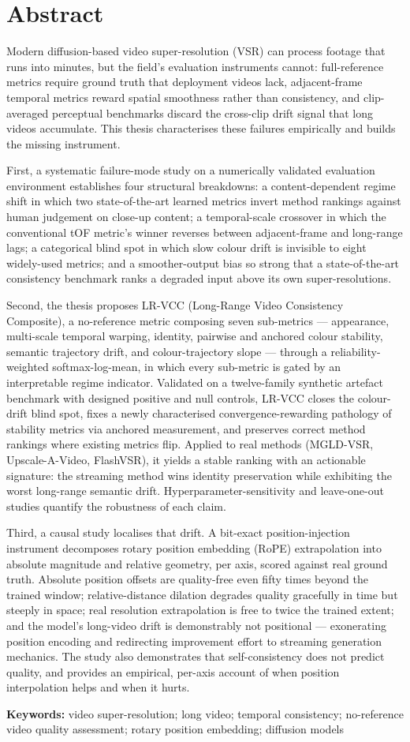 \chapter*{Abstract}
\thispagestyle{previous}

Modern diffusion-based video super-resolution (VSR) can process footage that
runs into minutes, but the field's evaluation instruments cannot: full-reference
metrics require ground truth that deployment videos lack, adjacent-frame
temporal metrics reward spatial smoothness rather than consistency, and
clip-averaged perceptual benchmarks discard the cross-clip drift signal that
long videos accumulate. This thesis characterises these failures empirically and
builds the missing instrument.

First, a systematic failure-mode study on a numerically validated evaluation
environment establishes four structural breakdowns: a content-dependent regime
shift in which two state-of-the-art learned metrics invert method rankings
against human judgement on close-up content; a temporal-scale crossover in which
the conventional tOF metric's winner reverses between adjacent-frame and
long-range lags; a categorical blind spot in which slow colour drift is
invisible to eight widely-used metrics; and a smoother-output bias so strong
that a state-of-the-art consistency benchmark ranks a degraded input above its
own super-resolutions.

Second, the thesis proposes LR-VCC (Long-Range Video Consistency Composite), a
no-reference metric composing seven sub-metrics --- appearance, multi-scale
temporal warping, identity, pairwise and anchored colour stability, semantic
trajectory drift, and colour-trajectory slope --- through a
reliability-weighted softmax-log-mean, in which every sub-metric is gated by an
interpretable regime indicator. Validated on a twelve-family synthetic artefact
benchmark with designed positive and null controls, LR-VCC closes the
colour-drift blind spot, fixes a newly characterised convergence-rewarding
pathology of stability metrics via anchored measurement, and preserves correct
method rankings where existing metrics flip. Applied to real methods (MGLD-VSR,
Upscale-A-Video, FlashVSR), it yields a stable ranking with an actionable
signature: the streaming method wins identity preservation while exhibiting the
worst long-range semantic drift. Hyperparameter-sensitivity and leave-one-out
studies quantify the robustness of each claim.

Third, a causal study localises that drift. A bit-exact position-injection
instrument decomposes rotary position embedding (RoPE) extrapolation into
absolute magnitude and relative geometry, per axis, scored against real ground
truth. Absolute position offsets are quality-free even fifty times beyond the
trained window; relative-distance dilation degrades quality gracefully in time
but steeply in space; real resolution extrapolation is free to twice the
trained extent; and the model's long-video drift is demonstrably not
positional --- exonerating position encoding and redirecting improvement effort
to streaming generation mechanics. The study also demonstrates that
self-consistency does not predict quality, and provides an empirical, per-axis
account of when position interpolation helps and when it hurts.

\textbf{Keywords:} video super-resolution; long video; temporal consistency;
no-reference video quality assessment; rotary position embedding; diffusion
models
\markabstract